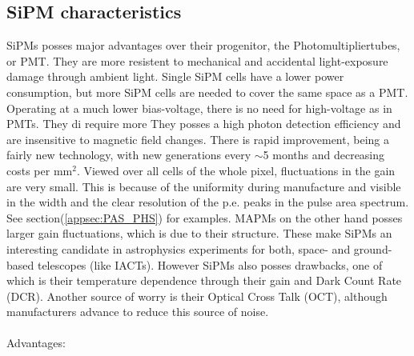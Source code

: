 \documentclass[12pt,article,type=msc,colorback,accentcolor=tud9c]{tudthesis}
\begin{document}
\subsection{SiPM characteristics}
\begin{figure}[b!]
\begin{centering}
}
\caption[Structure and carrier multiplication through an avalanche inside a SiPM]{Structure and carrier multiplication through an avalanche inside a SiPM. Picture from \cite{HPK_SiPM}}
\label{fig:SiPM_scheme}
\end{centering}
\end{figure}
SiPMs posses major advantages over their progenitor, the Photomultipliertubes, or PMT. They are more resistent to mechanical and accidental light-exposure damage through ambient light. Single SiPM cells have a lower power consumption, but more SiPM cells are needed to cover the same space as a PMT. Operating at a much lower bias-voltage, there is no need for high-voltage as in PMTs. They di require more  They posses a high photon detection efficiency and are insensitive to magnetic field changes. There is rapid improvement, being a fairly new technology, with new generations every $\sim$5 months and decreasing costs per mm$^2$. Viewed over all cells of the whole pixel, fluctuations in the gain are very small. This is because of the uniformity during manufacture and visible in the width and the clear resolution of the p.e. peaks in the pulse area spectrum. See section(\ref{appsec:PAS_PHS}) for examples. MAPMs on the other hand posses larger gain fluctuations, which is due to their structure. These make SiPMs an interesting candidate in astrophysics experiments for both, space- and ground-based telescopes (like IACTs). However SiPMs also posses drawbacks, one of which is their temperature dependence through their gain and Dark Count Rate (DCR). Another source of worry is their Optical Cross Talk (OCT), although manufacturers advance to reduce this source of noise.\\\\
\noindent Advantages:
\end{document}
